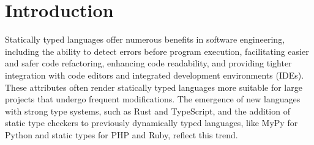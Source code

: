 \documentclass[pdflatex,sn-mathphys-num]{sn-jnl}%
\begin{document}
% 
% 
% 




\maketitle

\section{Introduction} \label{sec:introduction}
Statically typed languages offer numerous benefits in software engineering, including the ability to detect errors before program execution, facilitating easier and safer code refactoring, enhancing code readability, and providing tighter integration with code editors and integrated development environments (IDEs). These attributes often render statically typed languages more suitable for large projects that undergo frequent modifications. The emergence of new languages with strong type systems, such as Rust and TypeScript, and the addition of static type checkers to previously dynamically typed languages, like MyPy for Python and static types for PHP and Ruby, reflect this trend.
\end{document}
